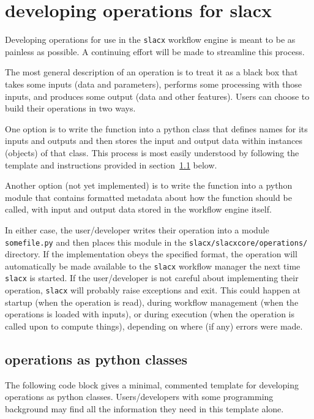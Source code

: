 \section{developing operations for slacx}
\label{sec:op_dev}

Developing operations for use in the \verb|slacx| workflow engine 
is meant to be as painless as possible.
A continuing effort will be made to streamline this process.

The most general description of an operation 
is to treat it as a black box that takes some inputs (data and parameters),
performs some processing with those inputs,
and produces some output (data and other features).
Users can choose to build their operations in two ways.

One option is to write the function into a python class
that defines names for its inputs and outputs
and then stores the input and output data 
within instances (objects) of that class.
This process is most easily understood 
by following the template and instructions 
provided in section~\ref{sec:op_dev_by_class} below.

Another option (not yet implemented)
is to write the function into a python module 
that contains formatted metadata 
about how the function should be called,
with input and output data 
stored in the workflow engine itself.

In either case, the user/developer writes their operation 
into a module \verb|somefile.py|
and then places this module in the \verb|slacx/slacxcore/operations/| directory.
If the implementation obeys the specified format, 
the operation will automatically be made available 
to the \verb|slacx| workflow manager
the next time \verb|slacx| is started.
If the user/developer is not careful 
about implementing their operation,
\verb|slacx| will probably raise exceptions and exit. 
This could happen at startup (when the operation is read),
during workflow management (when the operations is loaded with inputs),
or during execution (when the operation is called upon to compute things),
depending on where (if any) errors were made.


\subsection{operations as python classes}
\label{sec:op_dev_by_class}

The following code block gives a minimal, 
commented template for developing
operations as python classes.
Users/developers with some programming background
may find all the information they need in this template alone.

